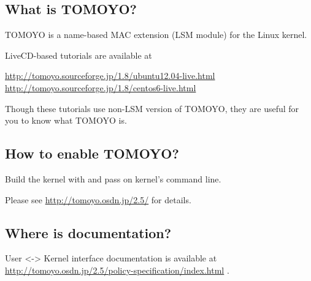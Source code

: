 \documentclass[a4paper,8pt,english]{sphinxmanual}
\begin{document}
\subsection{What is TOMOYO?}
\label{admin-guide/LSM/tomoyo:what-is-tomoyo}
TOMOYO is a name-based MAC extension (LSM module) for the Linux kernel.

LiveCD-based tutorials are available at

\href{http://tomoyo.sourceforge.jp/1.8/ubuntu12.04-live.html}{http://tomoyo.sourceforge.jp/1.8/ubuntu12.04-live.html}
\href{http://tomoyo.sourceforge.jp/1.8/centos6-live.html}{http://tomoyo.sourceforge.jp/1.8/centos6-live.html}

Though these tutorials use non-LSM version of TOMOYO, they are useful for you
to know what TOMOYO is.


\subsection{How to enable TOMOYO?}
\label{admin-guide/LSM/tomoyo:how-to-enable-tomoyo}
Build the kernel with  and pass  on
kernel's command line.

Please see \href{http://tomoyo.osdn.jp/2.5/}{http://tomoyo.osdn.jp/2.5/} for details.


\subsection{Where is documentation?}
\label{admin-guide/LSM/tomoyo:where-is-documentation}
User \textless{}-\textgreater{} Kernel interface documentation is available at
\href{http://tomoyo.osdn.jp/2.5/policy-specification/index.html}{http://tomoyo.osdn.jp/2.5/policy-specification/index.html} .
\end{document}
